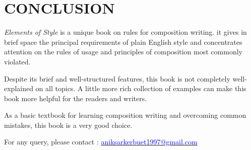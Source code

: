 \documentclass{report}
\begin{document}
\chapter{CONCLUSION}{
    \textit{Elements of Style} is a unique book on rules for composition writing. it gives in brief space the principal requirements of plain English style and concentrates attention on the rules of usage and principles of composition most commonly violated.
    
    \bigskip
    
    Despite its brief and well-structured features, this book is not completely well-explained on all topics. A little more rich collection of examples can make this book more helpful for the readers and writers.
    
    \bigskip
    
    As a basic textbook for learning composition writing and overcoming common mistakes, this book is a very good choice.
    
    \bigskip
    
    For any query, please contact : 
    \href{http://aniksarkerbuet1997@gmail.com}{\textcolor{blue}{aniksarkerbuet1997@gmail.com}}
}
\end{document}
